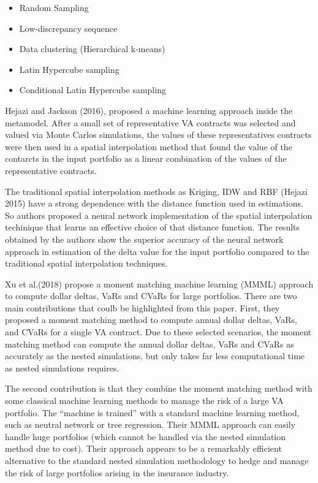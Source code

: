 \begin{itemize}
\item Random Sampling 
\item Low-discrepancy sequence
\item Data clustering (Hierarchical k-means)
\item Latin Hypercube sampling
\item Conditional Latin Hypercube sampling
\end{itemize}    

Hejazi and Jackson (2016), proposed a machine learning approach inside the metamodel. After a small set of representative VA contracts was selected and valued via Monte Carlos simulations, the values of these representatives contracts were then used in a spatial interpolation method that found the value of the contarcts in the input portfolio as  a linear combination of the values of the representative contracts. 

The traditional spatial interpolation methods as Kriging, IDW and RBF (Hejazi 2015) have a strong dependence with the distance function used in estimations. So authors proposed a neural network implementation of the spatial interpolation techinique that learns an effective choice of that distance function. The results obtained by the authors show the superior accuracy of the neural network approach in estimation of the delta value for the input portfolio compared to the traditional spatial interpolation techniques.

Xu et al.(2018) propose a moment matching machine learning (MMML) approach to compute dollar deltas, VaRs and CVaRs for large portfolios. There are two main contributions that coulb be highlighted from this paper. First, they proposed a moment matching method to compute annual dollar deltas, VaRs, and CVaRs for a single VA contract. Due to these selected scenarios, the moment matching method can compute the annual dollar deltas, VaRs and CVaRs as accurately as the nested simulations, but only takes far less computational time as nested simulations requires. 

The second contribution is that they combine the moment matching method with some classical machine learning methods to manage the risk of a large VA portfolio. The “machine is trained” with a standard machine learning method, such as neutral network or tree regression. Their MMML approach can easily handle huge portfolios (which cannot be handled via the nested simulation method due to cost). Their approach appears to be a remarkably efficient alternative to the standard nested simulation methodology to hedge and manage the risk of large portfolios arising in the insurance industry.

